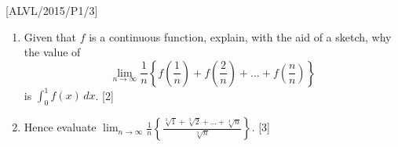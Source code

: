 \item {[}ALVL/2015/P1/3{]}
\begin{enumerate}
\item Given that $f$ is a continuous function, explain, with the aid of
a sketch, why the value of 
\[
\lim_{n\rightarrow\infty}\frac{1}{n}\left\{ f\left(\frac{1}{n}\right)+f\left(\frac{2}{n}\right)+\dots+f\left(\frac{n}{n}\right)\right\} 
\]
 is $\int_{0}^{1}f\left(x\right)\,dx$. {[}2{]}
\item Hence evaluate $\lim_{n\rightarrow\infty}\frac{1}{n}\left\{ \frac{\sqrt[3]{1}+\sqrt[3]{2}+\dots+\sqrt[3]{n}}{\sqrt[3]{n}}\right\} $.\hfill{}
{[}3{]}
\end{enumerate}
